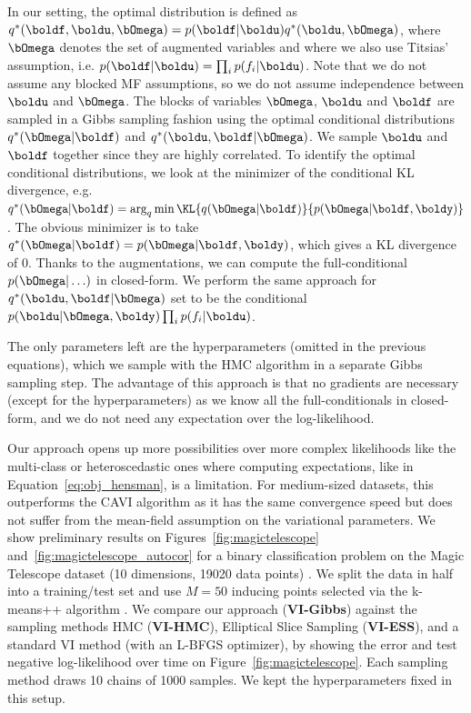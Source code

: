 In our setting, the optimal distribution is defined as $q^*(\boldf,\boldu,\bOmega) = p(\boldf|\boldu)q^*(\boldu, \bOmega)$, where $\bOmega$ denotes the set of augmented variables and where we also use Titsias' assumption, i.e. $p(\boldf|\boldu) = \prod_{i}p(f_i|\boldu)$.
Note that we do not assume any blocked \ac{MF} assumptions, so we do not assume independence between $\boldu$ and $\bOmega$.
The blocks of variables $\bOmega$, $\boldu$ and $\boldf$ are sampled in a Gibbs sampling fashion using the optimal conditional distributions $q^*(\bOmega|\boldf)$ and $q^*(\boldu,\boldf|\bOmega)$.
We sample $\boldu$ and $\boldf$ together since they are highly correlated.
To identify the optimal conditional distributions, we look at the minimizer of the conditional \ac{KL} divergence, e.g. $q^*(\bOmega|\boldf) = \arg_{q} \min \KL{q(\bOmega|\boldf)}{p(\bOmega|\boldf,\boldy)}$.
The obvious minimizer is to take $q^*(\bOmega|\boldf)=p(\bOmega|\boldf,\boldy)$, which gives a \ac{KL} divergence of 0.
Thanks to the augmentations, we can compute the full-conditional $p(\bOmega|\ldots)$ in closed-form.
We perform the same approach for $q^*(\boldu,\boldf|\bOmega)$ set to be the conditional $p(\boldu|\bOmega,\boldy)\prod_i p(f_i|\boldu)$.

The only parameters left are the hyperparameters (omitted in the previous equations), which we sample with the \ac{HMC} algorithm in a separate Gibbs sampling step.
The advantage of this approach is that no gradients are necessary (except for the hyperparameters) as we know all the full-conditionals in closed-form, and we do not need any expectation over the log-likelihood.

Our approach opens up more possibilities over more complex likelihoods like the multi-class or heteroscedastic ones where computing expectations, like in Equation~\eqref{eq:obj_hensman}, is a limitation.
For medium-sized datasets, this outperforms the \ac{CAVI} algorithm as it has the same convergence speed but does not suffer from the mean-field assumption on the variational parameters.
We show preliminary results on Figures~\ref{fig:magictelescope} and~\ref{fig:magictelescope_autocor} for a binary classification problem on the Magic Telescope dataset (10 dimensions, 19020 data points) \cite{bock2004methods}.
We split the data in half into a training/test set and use $M=50$ inducing points selected via the k-means++ algorithm \cite{arthur2007k}.
We compare our approach (\textbf{VI-Gibbs}) against the sampling methods \ac{HMC} (\textbf{VI-HMC}), Elliptical Slice Sampling (\textbf{VI-ESS}), and a standard \ac{VI} method (with an L-BFGS optimizer), by showing the error and test negative log-likelihood over time on Figure~\ref{fig:magictelescope}.
Each sampling method draws 10 chains of 1000 samples.
We kept the hyperparameters fixed in this setup.


